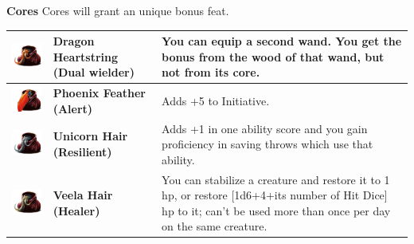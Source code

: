 \textbf{Cores} Cores will grant an unique bonus feat. \\

\begin{tabular}{ m{4cm}m{3cm}m{6cm} } \hline
	\includegraphics[width=4cm]{../Pictures/Gameplay/Items/Wearables/Wand/Cores/Dragon_heartstring_icon.png} & \textbf{Dragon Heartstring (Dual wielder)} & You can equip a second wand. You get the bonus from the wood of that wand, but not from its core. \\ \hline
	\includegraphics[width=4cm]{../Pictures/Gameplay/Items/Wearables/Wand/Cores/Phoenix_feather_icon.png} & \textbf{Phoenix Feather (Alert)} & Adds +5 to Initiative. \\ \hline
	\includegraphics[width=4cm]{../Pictures/Gameplay/Items/Wearables/Wand/Cores/Unicorn_hair_icon.png} & \textbf{Unicorn Hair (Resilient)} & Adds +1 in one ability score and you gain proficiency in saving throws which use that ability.  \\ \hline
	\includegraphics[width=4cm]{../Pictures/Gameplay/Items/Wearables/Wand/Cores/Veela_hair_icon.png} & \textbf{Veela Hair (Healer)} & You can stabilize a creature and restore it to 1 hp, or restore [1d6+4+its number of Hit Dice] hp to it; can't be used more than once per day on the same creature. \\ \hline

\end{tabular}
